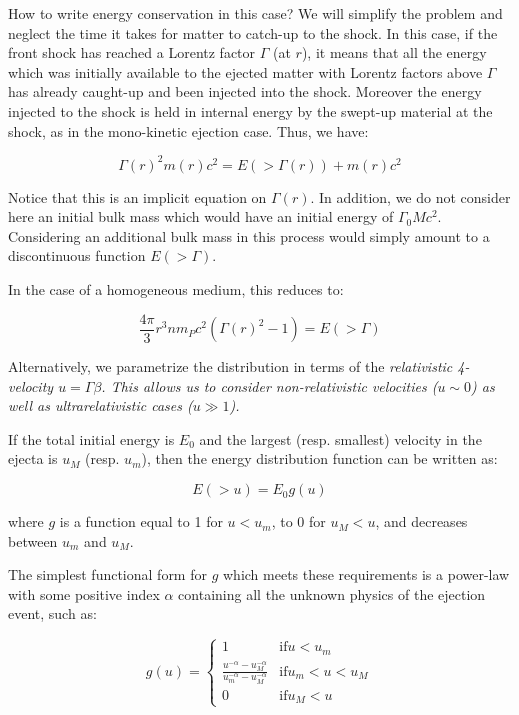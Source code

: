 How to write energy conservation in this case? We will simplify the problem and neglect the time it takes for matter to catch-up to the shock. In this case, if the front shock has reached a Lorentz factor $\Gamma$ (at $r$), it means that all the energy which was initially available to the ejected matter with Lorentz factors above $\Gamma$ has already caught-up and been injected into the shock. Moreover the energy injected to the shock is held in internal energy by the swept-up material at the shock, as in the mono-kinetic ejection case. Thus, we have:

$$ \Gamma(r)^2 m(r) c ^ 2 = E( > \Gamma(r)) + m(r) c ^ 2$$

Notice that this is an implicit equation on $\Gamma(r)$. In addition, we do not consider here an initial bulk mass which would have an initial energy of $\Gamma_0 M c^2$. Considering an additional bulk mass in this process would simply amount to a discontinuous function $ E( > \Gamma)$.

In the case of a homogeneous medium, this reduces to:

$$\frac{4\pi}{3}r^3 n m_P c^2(\Gamma(r)^2 - 1) = E( > \Gamma) $$


Alternatively, we parametrize the distribution in terms of the \it{relativistic 4-velocity} $u = \Gamma \beta$. This allows us to consider non-relativistic velocities ($u \sim 0$) as well as ultrarelativistic cases ($u \gg 1$).

If the total initial energy is $E_0$ and the largest (resp. smallest) velocity in the ejecta is $u_M$ (resp. $u_m$), then the energy distribution function can be written as:

$$ E( > u) = E_0 g(u) $$

where $g$ is a function equal to 1 for $u < u_m$, to 0 for $u_M < u$, and decreases between $u_m$ and $u_M$.

The simplest functional form for $g$ which meets these requirements is a power-law with some positive index $\alpha$ containing all the unknown physics of the ejection event, such as:

\begin{equation}
    g(u) = \left \{ \begin{array}{cl}
    1 & \text{if} u < u_m \\
    \frac{u ^ {-\alpha} - u_M^{-\alpha}}{u_m ^ {-\alpha} - u_M ^ {-\alpha}} & \text{if} u_m < u < u_M \\
    0 & \text{if} u_M < u
\end{array}
    \end{equation}

